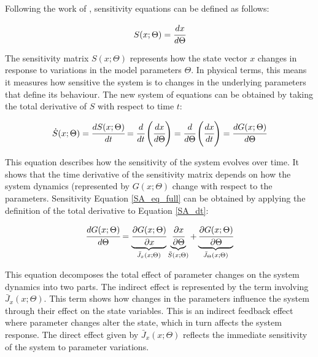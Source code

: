 \documentclass[a4paper,fleqn]{cas-dc}
\begin{document}
	Following the work of \citet{Maly1996}, sensitivity equations can be defined as follows:
	
	{\footnotesize
		\begin{equation}
			\label{SA_def}
			S(x;\Theta) = \cfrac{dx}{d\Theta}
	\end{equation} }
	
	The sensitivity matrix $S(x;\Theta)$ represents how the state vector $x$ changes in response to variations in the model parameters $\Theta$. In physical terms, this means it measures how sensitive the system is to changes in the underlying parameters that define its behaviour. The new system of equations can be obtained by taking the total derivative of $S$ with respect to time $t$:
	
	{\footnotesize
		\begin{equation} \label{SA_dt} 
			{\dot{S}}(x;\Theta)  = \cfrac{dS(x;\Theta)}{d t} = \cfrac{d}{d t} \left( \cfrac{dx}{d\Theta} \right) = \cfrac{d }{d\Theta} \left( \cfrac{dx}{d t} \right) = \cfrac{d G(x;\Theta)}{d\Theta} 
	\end{equation} }
	
	This equation describes how the sensitivity of the system evolves over time. It shows that the time derivative of the sensitivity matrix depends on how the system dynamics (represented by $G(x; \Theta)$ change with respect to the parameters. Sensitivity Equation \ref{SA_eq_full} can be obtained by applying the definition of the total derivative to Equation \ref{SA_dt}:
	
	{\footnotesize
		\begin{equation} \label{SA_eq_full}
			\cfrac{d G(x;\Theta)}{d \Theta} = \underbrace{ \cfrac{\partial G(x;\Theta)}{\partial x} }_{{\bar{J}_x}(x;\Theta)} \underbrace{\cfrac{\partial x}{\partial \Theta} }_{\bar{S}(x;\Theta)} + \underbrace{ \cfrac{\partial G(x;\Theta)}{\partial \Theta} }_{{\bar{J}_\Theta}(x;\Theta)}
	\end{equation} }

	This equation decomposes the total effect of parameter changes on the system dynamics into two parts. The indirect effect is represented by the term involving $\bar{J}_x (x; \Theta)$. This term shows how changes in the parameters influence the system through their effect on the state variables. This is an indirect feedback effect where parameter changes alter the state, which in turn affects the system response. The direct effect given by $\bar{J}_x (x; \Theta)$ reflects the immediate sensitivity of the system to parameter variations.
	
\end{document}
